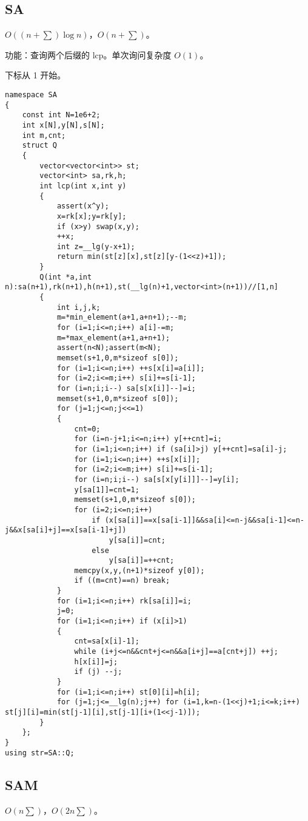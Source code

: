 \documentclass[12pt]{ctexart}
\begin{document}
\subsection{SA}

$O((n+\sum)\log n)$，$O(n+\sum)$。

功能：查询两个后缀的 lcp。单次询问复杂度 $O(1)$。

下标从 1 开始。

\begin{lstlisting}
namespace SA
{
	const int N=1e6+2;
	int x[N],y[N],s[N];
	int m,cnt;
	struct Q
	{
		vector<vector<int>> st;
		vector<int> sa,rk,h;
		int lcp(int x,int y)
		{
			assert(x^y);
			x=rk[x];y=rk[y];
			if (x>y) swap(x,y);
			++x;
			int z=__lg(y-x+1);
			return min(st[z][x],st[z][y-(1<<z)+1]);
		}
		Q(int *a,int n):sa(n+1),rk(n+1),h(n+1),st(__lg(n)+1,vector<int>(n+1))//[1,n]
		{
			int i,j,k;
			m=*min_element(a+1,a+n+1);--m;
			for (i=1;i<=n;i++) a[i]-=m;
			m=*max_element(a+1,a+n+1);
			assert(n<N);assert(m<N);
			memset(s+1,0,m*sizeof s[0]);
			for (i=1;i<=n;i++) ++s[x[i]=a[i]];
			for (i=2;i<=m;i++) s[i]+=s[i-1];
			for (i=n;i;i--) sa[s[x[i]]--]=i;
			memset(s+1,0,m*sizeof s[0]);
			for (j=1;j<=n;j<<=1)
			{
				cnt=0;
				for (i=n-j+1;i<=n;i++) y[++cnt]=i;
				for (i=1;i<=n;i++) if (sa[i]>j) y[++cnt]=sa[i]-j;
				for (i=1;i<=n;i++) ++s[x[i]];
				for (i=2;i<=m;i++) s[i]+=s[i-1];
				for (i=n;i;i--) sa[s[x[y[i]]]--]=y[i];
				y[sa[1]]=cnt=1;
				memset(s+1,0,m*sizeof s[0]);
				for (i=2;i<=n;i++)
					if (x[sa[i]]==x[sa[i-1]]&&sa[i]<=n-j&&sa[i-1]<=n-j&&x[sa[i]+j]==x[sa[i-1]+j])
						y[sa[i]]=cnt;
					else
						y[sa[i]]=++cnt;
				memcpy(x,y,(n+1)*sizeof y[0]);
				if ((m=cnt)==n) break;
			}
			for (i=1;i<=n;i++) rk[sa[i]]=i;
			j=0;
			for (i=1;i<=n;i++) if (x[i]>1)
			{
				cnt=sa[x[i]-1];
				while (i+j<=n&&cnt+j<=n&&a[i+j]==a[cnt+j]) ++j;
				h[x[i]]=j;
				if (j) --j;
			}
			for (i=1;i<=n;i++) st[0][i]=h[i];
			for (j=1;j<=__lg(n);j++) for (i=1,k=n-(1<<j)+1;i<=k;i++) st[j][i]=min(st[j-1][i],st[j-1][i+(1<<j-1)]);
		}
	};
}
using str=SA::Q;
\end{lstlisting}

\subsection{SAM}

$O(n\sum)$，$O(2n\sum )$。
\end{document}
